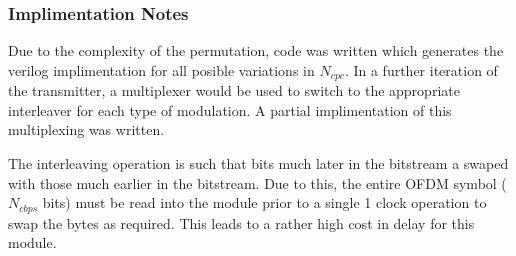 	\subsubsection{Implimentation Notes}

Due to the complexity of the permutation, code was written which generates the verilog implimentation for all posible variations in $N_{cpc}$. In a further iteration of the transmitter, a multiplexer would be used to switch to the appropriate interleaver for each type of modulation. A partial implimentation of this multiplexing was written.

The interleaving operation is such that bits much later in the bitstream a swaped with those much earlier in the bitstream. Due to this, the entire OFDM symbol ($N_{cbps}$ bits) must be read into the module prior to a single 1 clock operation to swap the bytes as required. This leads to a rather high cost in delay for this module.